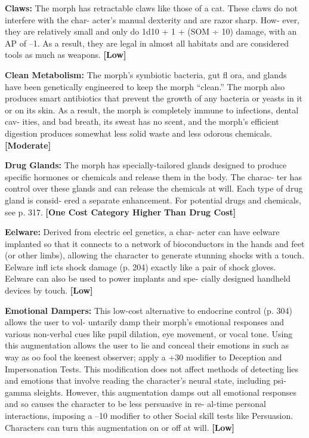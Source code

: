 \textbf{Claws: }The morph has retractable claws like those 
of a cat. These claws do not interfere with the char-
acter's manual dexterity and are razor sharp. How-
ever, they are relatively small and only do 1d10 + 1 
+ (SOM ÷ 10) damage, with an AP of –1. As a result, 
they are legal in almost all habitats and are considered 
tools as much as weapons. \textbf{[Low]}

\textbf{Clean Metabolism: }The morph's symbiotic bacteria, 
gut fl ora, and glands have been genetically engineered 
to keep the morph ``clean.'' The morph also produces 
smart antibiotics that prevent the growth of any 
bacteria or yeasts in it or on its skin. As a result, the 
morph is completely immune to infections, dental cav-
ities, and bad breath, its sweat has no scent, and the 
morph's efficient digestion produces somewhat less 
solid waste and less odorous chemicals. \textbf{[Moderate]}

\textbf{Drug Glands: }The morph has specially-tailored 
glands designed to produce specific hormones or 
chemicals and release them in the body. The charac-
ter has control over these glands and can release the 
chemicals at will. Each type of drug gland is consid-
ered a separate enhancement. For potential drugs and 
chemicals, see p. 317. \textbf{[One Cost Category Higher }
\textbf{Than Drug Cost]}

\textbf{Eelware:} Derived from electric eel genetics, a char-
acter can have eelware implanted so that it connects 
to a network of bioconductors in the hands and feet 
(or other limbs), allowing the character to generate 
stunning shocks with a touch. Eelware infl icts shock 
damage (p. 204) exactly like a pair of shock gloves. 
Eelware can also be used to power implants and spe-
cially designed handheld devices by touch. \textbf{[Low]}

\textbf{Emotional Dampers: }This low-cost alternative to 
endocrine control (p. 304) allows the user to vol-
untarily damp their morph's emotional responses 
and various non-verbal cues like pupil dilation, eye 
movement, or vocal tone. Using this augmentation 
allows the user to lie and conceal their emotions in 
such as way as oo fool the keenest observer; apply a 
+30 modifier to Deception and Impersonation Tests. 
This modification does not affect methods of detecting 
lies and emotions that involve reading the character's 
neural state, including psi-gamma sleights. However, 
this augmentation damps out all emotional responses 
and so causes the character to be less persuasive in re-
al-time personal interactions, imposing a –10 modifier 
to other Social skill tests like Persuasion. Characters 
can turn this augmentation on or off at will. \textbf{[Low]}

